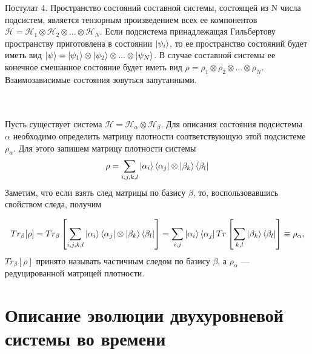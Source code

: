 \documentclass[a4paper, 10pt]{article}
\begin{document}
        \begin{itshape}
            Постулат 4. Пространство состояний составной системы, состоящей из N числа подсистем, является тензорным произведением всех ее компонентов $\mathscr{H} = \mathscr{H}_1  \otimes  \mathscr{H}_2  \otimes ... \otimes \mathscr{H}_N$. Если подсистема принадлежащая Гильбертову пространству приготовлена в состоянии $\ket{\psi_i}$, 
            то ее пространство состояний будет иметь вид $\ket{\psi} = \ket{\psi_1}  \otimes  \ket{\psi_2}  \otimes  ... \otimes  \ket{\psi_N}$. В случае составной системы ее конечное смешанное состояние будет иметь вид $\rho = \rho_1  \otimes  \rho_2  \otimes ... \otimes \rho_N$. Взаимозависимые состояния зовуться запутанными.
        \end{itshape}
        \\
        \\
        Пусть существует система $\mathscr{H} = \mathscr{H}_\alpha \otimes \mathscr{H}_\beta$. Для описания состояния подсистемы $\alpha$ необходимо определить матрицу плотности соответствующую этой подсистеме $\rho_\alpha$. Для этого запишем матрицу плотности системы 
        \begin{equation}
            \rho = \sum_{i,j,k,l} \ket{\alpha_i}\bra{\alpha_j} \otimes \ket{\beta_k} \bra{\beta_l}
        \end{equation}
        Заметим, что если взять след матрицы по базису $\beta$, то, воспользовавшись свойством следа, получим

        \begin{equation}
            Tr_\beta[\rho] = Tr_\beta\left[\sum_{i,j,k,l} \ket{\alpha_i}\bra{\alpha_j} \otimes \ket{\beta_k} \bra{\beta_l}\right] =\sum_{i,j}\ket{\alpha_i}\bra{\alpha_j} Tr\left[\sum_{k,l} \ket{\beta_k} \bra{\beta_l}\right] \equiv \rho_\alpha,
        \end{equation}
        $Tr_\beta[\rho]$ принято называть частичным следом по базису $\beta$, а $\rho_\alpha$ --- редуцированной матрицей плотности.
        \newpage
        \section{Описание эволюции двухуровневой системы во времени}
\end{document}
